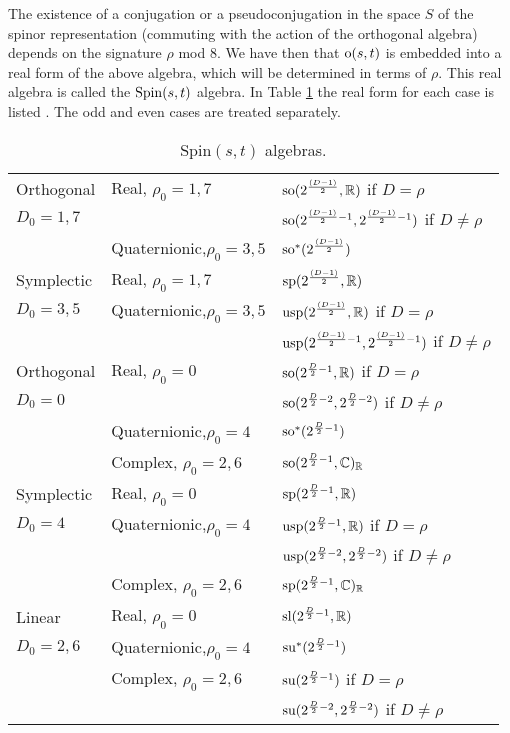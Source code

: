 \documentclass[a4paper,12pt]{article}
\begin{document}
The existence of a conjugation or a pseudoconjugation in the space
$S$ of the spinor representation (commuting with the action of the
orthogonal algebra) depends on the signature $\rho$ mod 8. We have
then that ${\rm o}(s,t)$ is embedded into a real form of the above
algebra, which will be determined in terms of $\rho$. This real
algebra is called the ${\rm Spin}(s,t)$ algebra. In Table
\ref{spinalgebra} the real form for each case is listed
\cite{dflv}. The odd and even cases are treated separately.

\begin{table}[ht]
\begin{center}
\begin{tabular} {|l |l|l|}
\hline Orthogonal&Real, $\rho_0=1,7$&${\rm
so}(2^{\frac{(D-1)}{2}},\mathbb{R})$ if $D=\rho$\\  \cline{3-3}
$D_0=1,7$&& ${\rm
so}(2^{\frac{(D-1)}{2}-1},2^{\frac{(D-1)}{2}-1})$
 if
$D\neq\rho$\\\cline{2-3} & Quaternionic,\;$\rho_0=3,5$&${\rm
so}^*(2^{\frac{(D-1)}{2}})$\\\hline\hline Symplectic&Real,
$\rho_0=1,7$& ${\rm sp}(2^{\frac{(D-1)}{2}},\mathbb{R})$\\\cline{2-3}
$D_0=3,5$& Quaternionic,\;$\rho_0=3,5$& ${\rm
usp}(2^{\frac{(D-1)}{2}},\mathbb{R})$  if $D=\rho$\\\cline{3-3} && ${\rm
usp}(2^{\frac{(D-1)}{2}-1},2^{\frac{(D-1)}{2}-1})$ if $D\neq
\rho$\\\hline\hline\hline
 Orthogonal&Real, $\rho_0=0$&${\rm
so}(2^{\frac{D}{2}-1},\mathbb{R})$ if $D=\rho$\\  \cline{3-3} $D_0=0$&&
${\rm so}(2^{\frac{D}{2}-2},2^{\frac{D}{2}-2})$
 if
$D\neq\rho$\\\cline{2-3}
 & Quaternionic,\;$\rho_0=4$&${\rm
so}^*(2^{\frac{D}{2}-1})$\\\cline{2-3} &Complex, $\rho_0=2,6$&
${\rm so}(2^{\frac{D}{2}-1},\mathbb{C})_{\mathbb{R}}$\\\hline\hline Symplectic&Real,
$\rho_0=0$& ${\rm sp}(2^{\frac{D}{2}-1},\mathbb{R})$\\\cline{2-3} $D_0=4$&
Quaternionic,\;$\rho_0=4$& ${\rm usp}(2^{\frac{D}{2}-1},\mathbb{R})$ if
$D=\rho$\\\cline{3-3} && ${\rm
usp}(2^{\frac{D}{2}-2},2^{\frac{D}{2}-2})$ if $D\neq
\rho$\\\cline{2-3} &Complex, $\rho_0=2,6$&${\rm
sp}(2^{\frac{D}{2}-1},\mathbb{C})_{\mathbb{R}}$\\\hline\hline

 Linear&Real,
$\rho_0=0$& ${\rm sl}(2^{\frac{D}{2}-1},\mathbb{R})$\\\cline{2-3}
$D_0=2,6$& Quaternionic,\;$\rho_0=4$& ${\rm
su}^*(2^{\frac{D}{2}-1})$ \\\cline{2-3} &Complex, $\rho_0=2,6$&
${\rm su}(2^{\frac{D}{2}-1})$ if $D= \rho$\\\cline{3-3} &&${\rm
su}(2^{\frac{D}{2}-2},2^{\frac{D}{2}-2})$ if $D\neq \rho$\\\hline
\end{tabular}
\caption{Spin$(s,t)$ algebras.}\label{spinalgebra}
\end{center}
\end{table}
\end{document}
